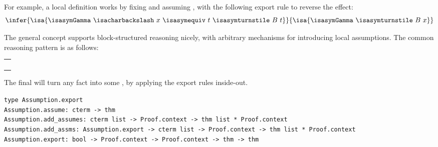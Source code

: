 \begin{isabellebody}
\begin{isamarkuptext}
  For example, a local definition works by fixing  and
  assuming , with the following export rule to reverse
  the effect:
  \[
  \infer{\isa{{\isasymGamma}\ {\isacharbackslash}\ x\ {\isasymequiv}\ t\ {\isasymturnstile}\ B\ t}}{\isa{{\isasymGamma}\ {\isasymturnstile}\ B\ x}}
  \]

  \medskip The general concept supports block-structured reasoning
  nicely, with arbitrary mechanisms for introducing local assumptions.
  The common reasoning pattern is as follows:

  \medskip
  \begin{tabular}{l}
  \isa{add{\isacharunderscore}assm\ e\isactrlisub {\isadigit{1}}\ A\isactrlisub {\isadigit{1}}} \\
  \isa{{\isasymdots}} \\
  \isa{add{\isacharunderscore}assm\ e\isactrlisub n\ A\isactrlisub n} \\
  \isa{export} \\
  \end{tabular}
  \medskip

  \noindent The final  will turn any fact  into some , by
  applying the export rules 
  inside-out.%
\end{isamarkuptext}%
\isamarkuptrue%
%
\isadelimmlref
%
\endisadelimmlref
%
\isatagmlref
%
\begin{isamarkuptext}%
\begin{mldecls}
  \verb|type Assumption.export| \\
  \verb|Assumption.assume: cterm -> thm| \\
  \verb|Assumption.add_assumes: cterm list -> Proof.context -> thm list * Proof.context| \\
  \verb|Assumption.add_assms: Assumption.export -> cterm list -> Proof.context -> thm list * Proof.context| \\
  \verb|Assumption.export: bool -> Proof.context -> Proof.context -> thm -> thm| \\
  \end{mldecls}

  \begin{description}


\end{description}
\end{isamarkuptext}
\end{isabellebody}
